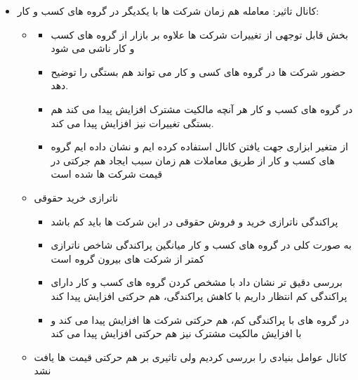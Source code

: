 \documentclass[12pt, a4paper]{article}
\begin{document}
\begin{itemize}
\item
کانال تاثیر: معامله هم زمان شرکت ها با یکدیگر در گروه های کسب و کار:
\begin{itemize}
\item
{}
\begin{itemize}
\item
بخش قابل توجهی از تغییرات 
شرکت ها علاوه بر بازار از گروه های کسب و کار ناشی می شود
\item
حضور شرکت ها در گروه های کسی و کار می تواند هم بستگی 
را توضیح دهد.
\item
در گروه های کسب و کار هر آنچه مالکیت مشترک افزایش پیدا می کند هم بستگی تغییرات 
نیز افزایش پیدا می کند.
\item
از متغیر ابزاری جهت یافتن کانال استفاده کرده ایم و نشان داده ایم گروه های کسب و کار از طریق معاملات هم زمان سبب ایجاد هم جرکتی در قیمت شرکت ها شده است
% 	
% 		
% 	
\end{itemize}
\item 
ناترازی خرید حقوقی
\begin{itemize}
\item
پراکندگی ناترازی خرید و فروش حقوقی در این شرکت ها باید کم باشد
\item 
به صورت کلی در گروه های کسب و کار میانگین پراکندگی شاخص ناترازی کمتر از شرکت های بیرون گروه است
\item
 بررسی دقیق تر نشان داد با مشخص کردن گروه های کسب و کار دارای پراکندگی کم انتظار داریم با کاهش پراکندگی، هم حرکتی افزایش پیدا کند
 \item
 در گروه های با پراکندگی کم، هم حرکتی شرکت ها افزایش پیدا می کند و با افزایش مالکیت مشترک نیز هم حرکتی افزایش پیدا می کند
 
\end{itemize}
\item
کانال عوامل بنیادی را بررسی کردیم ولی تاثیری بر هم حرکتی قیمت ها یافت نشد

\end{itemize}
\end{itemize}
\end{document}
